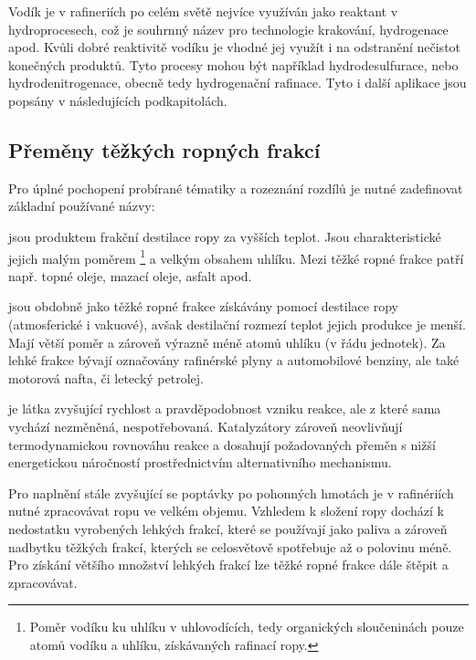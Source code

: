 Vodík je v rafineriích po celém světě nejvíce využíván jako reaktant v hydroprocesech, což je souhrnný název pro technologie krakování, hydrogenace apod. \cite{Speight2020} Kvůli dobré reaktivitě vodíku je vhodné jej využít i na odstranění nečistot konečných produktů. Tyto procesy mohou být například hydrodesulfurace, nebo hydrodenitrogenace, obecně tedy hydrogenační rafinace. Tyto i další aplikace jsou popsány v následujících podkapitolách.

\subsection{Přeměny těžkých ropných frakcí}
\label{subsec:premenytrp}

Pro úplné pochopení probírané tématiky a rozeznání rozdílů je nutné zadefinovat základní používané názvy:
\begin{description}[style=unboxed,leftmargin=0cm]
\item[Těžké ropné frakce] jsou produktem frakční destilace ropy za vyšších teplot. Jsou charakteristické jejich malým poměrem \footnote{Poměr vodíku ku uhlíku v uhlovodících, tedy organických sloučeninách pouze atomů vodíku a uhlíku, získávaných rafinací ropy.} a velkým obsahem uhlíku. Mezi těžké ropné frakce patří např. topné oleje, mazací oleje, asfalt apod. \cite{Blazek2006}
\item[Lehké ropné frakce] jsou obdobně jako těžké ropné frakce získávány pomocí destilace ropy (atmosferické i vakuové), avšak destilační rozmezí teplot jejich produkce je menší. Mají větší poměr  a zároveň výrazně méně atomů uhlíku (v řádu jednotek). Za lehké frakce bývají označovány rafinérské plyny a automobilové benziny, ale také motorová nafta, či letecký petrolej. \cite{Blazek2006}
\item[Katalyzátor] je látka zvyšující rychlost a pravděpodobnost vzniku reakce, ale z které sama vychází nezměněná, nespotřebovaná. Katalyzátory zároveň neovlivňují termodynamickou rovnováhu reakce a dosahují požadovaných přeměn s nižší energetickou náročností prostřednictvím alternativního mechanismu. \cite{Bartovska2016}
\end{description}
Pro naplnění stále zvyšující se poptávky po pohonných hmotách je v rafinériích nutné zpracovávat ropu ve velkém objemu. Vzhledem k složení ropy dochází k nedostatku vyrobených lehkých frakcí, které se používají jako paliva a zároveň nadbytku těžkých frakcí, kterých se celosvětově spotřebuje až o polovinu méně. \cite{Blazek2006} Pro získání většího množství lehkých frakcí lze těžké ropné frakce dále štěpit a zpracovávat.

